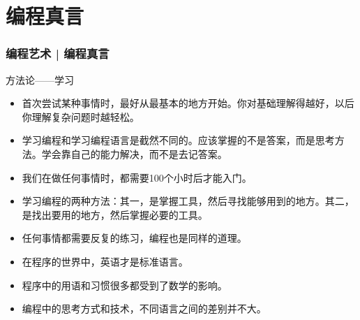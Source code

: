\section{编程真言}
\begin{frame}
  \frametitle{编程艺术 | 编程真言}
  \begin{block}{方法论——学习}
    \begin{itemize}
      \item 首次尝试某种事情时，最好从最基本的地方开始。你对\alert{基础}理解得越好，以后你理解复杂问题时越轻松。
    \item \alert{学习编程}和学习编程语言是截然不同的。应该掌握的不是答案，而是\alert{思考方法}。学会靠自己的能力解决，而不是去记答案。
      \item 我们在做任何事情时，都需要100个小时后才能入门。
      \item 学习编程的两种方法：其一，是掌握工具，然后寻找能够用到的地方。其二，是找出要用的地方，然后掌握必要的工具。
      \item 任何事情都需要反复的\alert{练习}，编程也是同样的道理。
      \item 在程序的世界中，\alert{英语}才是标准语言。
      \item 程序中的用语和习惯很多都受到了\alert{数学}的影响。
      \item 编程中的思考方式和技术，不同语言之间的差别并不大。
    \end{itemize}
  \end{block}
\end{frame}


